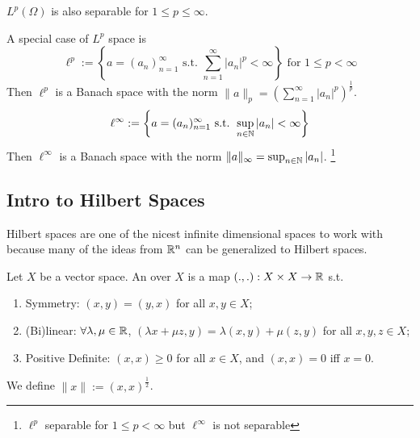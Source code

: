 \begin{rem}
    $L^p(\Omega)$ is also separable for $1 \leq p \leq \infty$.  
\end{rem}

\begin{rem}
    A special case of $L^p$ space is
    \[
        \ell^p := \left\{ a = (a_n)_{n = 1}^\infty \text{ s.t. } 
        \sum_{n = 1}^\infty |a_n|^p < \infty \right\} \text{ for } 1 \leq p < \infty
    \]  
    Then $\ell^p$ is a Banach space with the norm $\| a \|_p = (\sum_{n = 1}^\infty |a_n|^p)^{\frac{1}{p}}$.
    \[
        \ell^\infty := \left\{ a = (a_n)_{n = 1}^\infty \text{ s.t. } \sup_{n \in \mathbb{N}} |a_n| < \infty \right\}
    \] 
    Then $\ell^\infty$ is a Banach space with the norm $\| a \|_\infty = \sup_{n \in \mathbb{N}} |a_n|$.
    \footnote{$\ell^p$ separable for $1 \leq p < \infty$ but $\ell^\infty$ is not separable}
\end{rem}


\subsection{Intro to Hilbert Spaces}
Hilbert spaces are one of the nicest infinite dimensional spaces to work with because
many of the ideas from $\mathbb{R}^n$ can be generalized to Hilbert spaces.  

\begin{defn}
    Let $X$ be a vector space. An  over $X$ is a map 
    $( ., . ) : X \times X \to \mathbb{R}$ s.t. 
    \begin{enumerate}
        \item Symmetry: $(x, y) = (y, x)$ for all $x, y \in X$;
        \item (Bi)linear: $\forall \lambda, \mu \in \mathbb{R}$, $(\lambda x + \mu z, y) = 
        \lambda(x, y) + \mu(z, y)$ for all $x, y, z \in X$;
        \item Positive Definite: $(x, x) \geq 0$ for all $x \in X$, and $(x, x) = 0$ iff $x = 0$.
    \end{enumerate}
    We define $\| x \| := (x, x )^{\frac{1}{2}}$.
\end{defn}

